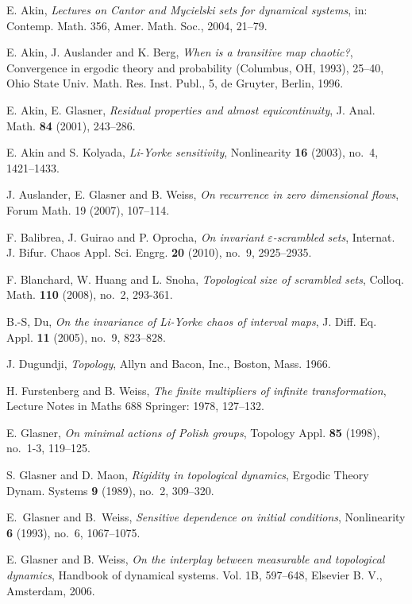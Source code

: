\documentclass[reqno,a4paper,12pt]{amsart}
\theoremstyle{definition}
\numberwithin{equation}{section}
\begin{document}
\begin{thebibliography}{99}
 E. Akin, \emph{Lectures on Cantor and Mycielski sets for dynamical systems},
in: Contemp. Math. 356, Amer. Math. Soc., 2004, 21--79.

 E. Akin, J. Auslander and K. Berg, \emph{When is a transitive map chaotic?},
Convergence in ergodic theory and probability (Columbus, OH, 1993), 25--40,
Ohio State Univ. Math. Res. Inst. Publ., 5, de Gruyter, Berlin, 1996.

 E. Akin, E. Glasner, \emph{Residual properties and almost equicontinuity},
J. Anal. Math. \textbf{84} (2001), 243--286.

 E. Akin and S. Kolyada, \emph{Li-Yorke sensitivity}, Nonlinearity \textbf{16} (2003), no.~4, 1421--1433.

 J. Auslander, E. Glasner and B. Weiss, \emph{On recurrence in zero dimensional flows},
Forum Math. 19 (2007), 107--114.

 F. Balibrea, J. Guirao and P. Oprocha, \emph{On invariant $\varepsilon$-scrambled sets},
Internat. J. Bifur. Chaos Appl. Sci. Engrg. \textbf{20} (2010), no.~9, 2925--2935.

 F. Blanchard, W. Huang and L. Snoha, \emph{Topological size of scrambled sets},
Colloq. Math. \textbf{110} (2008), no.~2, 293-361.

 B.-S, Du, \emph{On the invariance of Li-Yorke chaos of
interval maps}, J. Diff. Eq. Appl. \textbf{11} (2005),  no.~9, 823--828.

 J. Dugundji, \emph{Topology}, Allyn and Bacon, Inc., Boston, Mass. 1966.

 H. Furstenberg and B. Weiss, \emph{The finite multipliers of infinite transformation},
 Lecture Notes in Maths 688 Springer: 1978, 127--132.

 E. Glasner, \emph{On minimal actions of Polish groups},
Topology Appl. \textbf{85} (1998), no.~1-3, 119--125.

 S. Glasner and D. Maon, \emph{Rigidity in topological dynamics},
Ergodic Theory Dynam. Systems \textbf{9} (1989),  no.~2, 309--320.

 E.~Glasner and B.~Weiss, \emph{Sensitive dependence on initial conditions},
Nonlinearity \textbf{6} (1993), no.~6, 1067--1075.

 E. Glasner and B. Weiss, \emph{On the interplay between measurable and topological dynamics},
Handbook of dynamical systems. Vol. 1B, 597--648, Elsevier B. V., Amsterdam, 2006.


\end{thebibliography}
\end{document}
